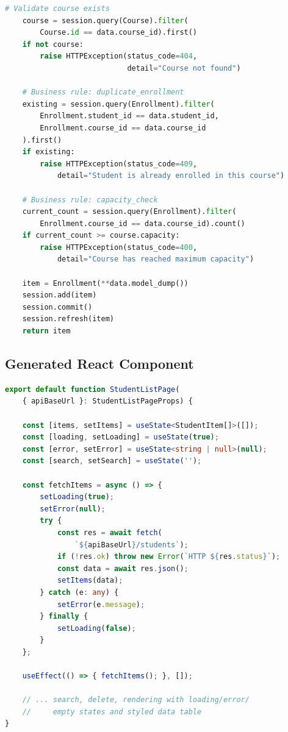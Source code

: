 \documentclass[11pt,a4paper]{article}
\begin{document}
{\begin{lstlisting}[language=Python, caption={Generated routes.py excerpt---enrollment creation with business logic}]
    # Validate course exists
    course = session.query(Course).filter(
        Course.id == data.course_id).first()
    if not course:
        raise HTTPException(status_code=404,
                            detail="Course not found")

    # Business rule: duplicate_enrollment
    existing = session.query(Enrollment).filter(
        Enrollment.student_id == data.student_id,
        Enrollment.course_id == data.course_id
    ).first()
    if existing:
        raise HTTPException(status_code=409,
            detail="Student is already enrolled in this course")

    # Business rule: capacity_check
    current_count = session.query(Enrollment).filter(
        Enrollment.course_id == data.course_id).count()
    if current_count >= course.capacity:
        raise HTTPException(status_code=400,
            detail="Course has reached maximum capacity")

    item = Enrollment(**data.model_dump())
    session.add(item)
    session.commit()
    session.refresh(item)
    return item
\end{lstlisting}

\subsection{Generated React Component}

\begin{lstlisting}[language=TypeScript, caption={Generated StudentListPage.tsx excerpt}]
export default function StudentListPage(
    { apiBaseUrl }: StudentListPageProps) {

    const [items, setItems] = useState<StudentItem[]>([]);
    const [loading, setLoading] = useState(true);
    const [error, setError] = useState<string | null>(null);
    const [search, setSearch] = useState('');

    const fetchItems = async () => {
        setLoading(true);
        setError(null);
        try {
            const res = await fetch(
                `${apiBaseUrl}/students`);
            if (!res.ok) throw new Error(`HTTP ${res.status}`);
            const data = await res.json();
            setItems(data);
        } catch (e: any) {
            setError(e.message);
        } finally {
            setLoading(false);
        }
    };

    useEffect(() => { fetchItems(); }, []);

    // ... search, delete, rendering with loading/error/
    //     empty states and styled data table
}
\end{lstlisting}

}
\end{document}
